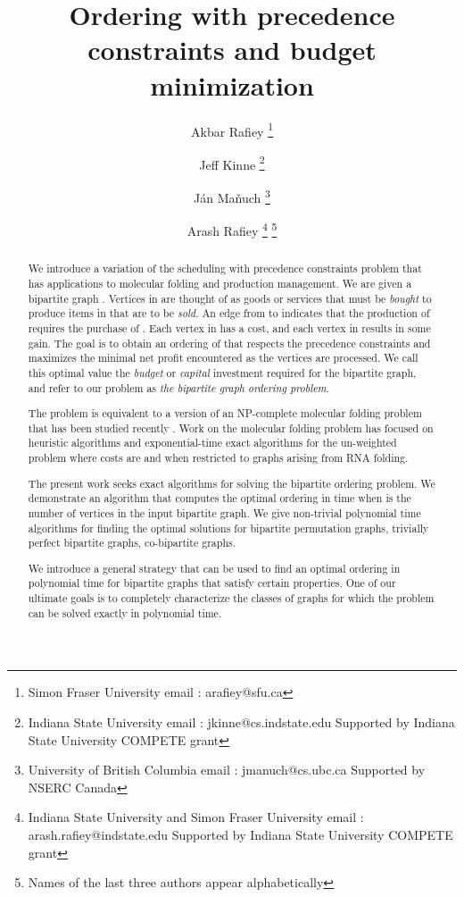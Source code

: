 \documentclass[letterpaper,11pt,abstracton]{scrartcl}
\begin{document}
\title{Ordering with precedence constraints and budget minimization}


\author{Akbar Rafiey \thanks{Simon Fraser University email : arafiey@sfu.ca} \and 
Jeff Kinne \thanks{Indiana State University email : jkinne@cs.indstate.edu Supported by Indiana State University COMPETE grant} \and
J\'an Ma\v nuch \thanks{University of British Columbia email : jmanuch@cs.ubc.ca  Supported by NSERC Canada} \and
Arash Rafiey \thanks{Indiana State University and Simon Fraser University email :  
arash.rafiey@indstate.edu Supported by Indiana State University COMPETE grant} \footnote{Names of the last three authors appear alphabetically}
}


\date{}
\maketitle




\begin{abstract}
We introduce a variation of the scheduling with precedence
constraints problem that has applications to molecular folding and
production management. We are given a bipartite graph
.  Vertices in  are thought of as goods or services that must be
\emph{bought} to produce items in  that are to be \emph{sold}.  An
edge from  to  indicates that the production of
 requires the purchase of .  Each vertex in  has a cost, and
each vertex in  results in some gain.  The goal
is to obtain an ordering of  that respects the precedence
constraints and maximizes the minimal net profit encountered as the vertices
are processed.  We call this optimal value the \emph{budget} or
\emph{capital} investment required for the bipartite graph, and refer to our
problem as \emph{the bipartite graph ordering problem}.

The problem is equivalent to a version of an NP-complete molecular folding problem
that has been studied recently \cite{MTSC09}. Work on
the molecular folding problem has focused on heuristic algorithms and
exponential-time exact algorithms for the un-weighted problem where costs
are  and when restricted to graphs arising from RNA folding.

The present work seeks exact algorithms for solving the bipartite
ordering problem.  We demonstrate an algorithm that computes
the optimal ordering in time  when  is the number of vertices
in the input bipartite graph. We give non-trivial polynomial time algorithms for finding
the optimal solutions for bipartite permutation graphs, trivially perfect bipartite graphs, co-bipartite graphs.

We introduce a general strategy that can
be used to find an optimal ordering in polynomial time for bipartite graphs
that satisfy certain properties. One of our ultimate goals is to completely characterize
the classes of graphs for which the problem can be solved exactly
in polynomial time.




\end{abstract}
\end{document}
